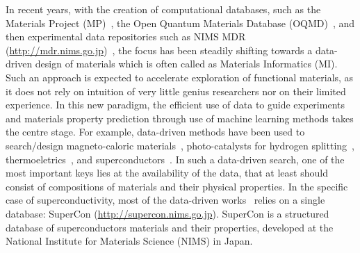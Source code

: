 \documentclass{article}
\begin{document}

In recent years, with the creation of computational databases, such as the Materials Project (MP)~\cite{materialsprojectJain2013}, the Open Quantum Materials Database (OQMD)~\cite{oqmdkirklin2015open}, and then experimental data repositories such as NIMS MDR (\url{http://mdr.nims.go.jp})~\cite{ranganathan_anusha_2019_3553963}, the focus has been steadily shifting towards a data-driven design of materials which is often called as Materials Informatics (MI). 
Such an approach is expected to accelerate exploration of functional materials, as it does not rely on intuition of very little genius researchers nor on their limited experience.
In this new paradigm, the efficient use of data to guide experiments and materials property prediction through use of machine learning methods takes the centre stage. 
For example, data-driven methods have been used to search/design magneto-caloric materials~\cite{Bocarsly2017,Castro2020,court2021inverse}, photo-catalysts for hydrogen splitting~\cite{xiong2021optimizing}, thermoeletrics~\cite{iwasaki2019machine}, and superconductors~\cite{stanev_machine_2017}. 
In such a data-driven search, one of the most important keys lies at the availability of the data, that at least should consist of compositions of materials and their physical properties. 
In the specific case of superconductivity, most of the data-driven works~\cite{stanev_machine_2017, le2020critical,Hamlin2019SuperconductivityNR} relies on a single database: SuperCon (\url{http://supercon.nims.go.jp}). 
SuperCon is a structured database of superconductors materials and their properties, developed at the National Institute for Materials Science (NIMS) in Japan. 

\end{document}
